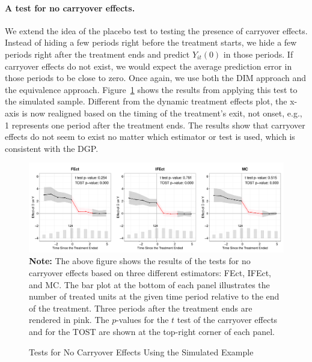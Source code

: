 \documentclass[12pt]{article}
\begin{document}
\paragraph{A test for no carryover effects.} We extend the idea of the placebo test to testing the presence of carryover effects. Instead of hiding a few periods right before the treatment starts, we hide a few periods right after the treatment ends and predict $Y_{it}(0)$ in those periods. If carryover effects do not exist, we would expect the average prediction error in those periods to be close to zero. Once again, we use both the DIM approach and the equivalence approach. Figure~\ref{fg:carryover} shows the results from applying this test to the simulated sample. Different from the dynamic treatment effects plot, the x-axis is now realigned based on the timing of the treatment's exit, not onset, e.g., 1 represents one period after the treatment ends. The results show that carryover effects do not seem to exist no matter which estimator or test is used, which is consistent with the DGP.

\begin{figure}[!ht]
\caption{Tests for No Carryover Effects Using the Simulated Example}\label{fg:carryover}
\centering
\begin{minipage}{1\linewidth}{\centering
\includegraphics[width = 1\textwidth]{sim0_carryover.pdf}\\}
 \footnotesize\textbf{Note:} The above figure shows the results of the tests for no carryover effects based on three different estimators: FEct, IFEct, and MC. The bar plot at the bottom of each panel illustrates the number of treated units at the given time period relative to the end of the treatment. Three periods  after the treatment ends are rendered in pink. The $p$-values for the $t$ test of the carryover effects and for the TOST are shown at the top-right corner of each panel. 
\end{minipage}
\end{figure}
\end{document}
